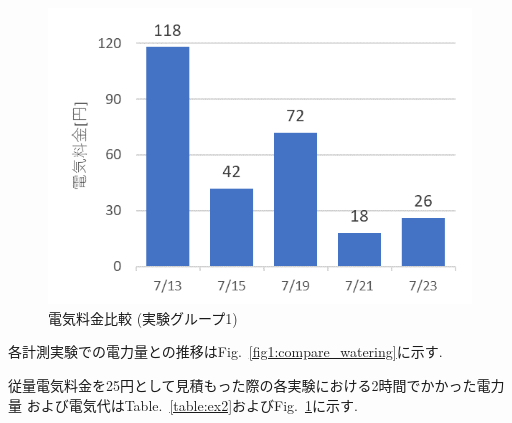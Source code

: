 \documentclass[a4j,fleqn,dvipdfmx,uplatex]{jsarticle}
\newcommand{\figref}[1]{Fig.\ \ref{#1}}
\newcommand{\tableref}[1]{Table.\ \ref{#1}}
\begin{document}
\begin{figure}[htb]
  \centering
  \includegraphics[width=\linewidth]{img/fee_27.png}
  \caption{電気料金比較 (実験グループ1)}
  \label{fig:fee_27}
\end{figure}

各計測実験での電力量との推移は\figref{fig1:compare_watering}に示す. 

従量電気料金を25円として見積もった際の各実験における2時間でかかった電力量
および電気代は\tableref{table:ex2}および\figref{fig:fee_27}に示す. 
\end{document}
